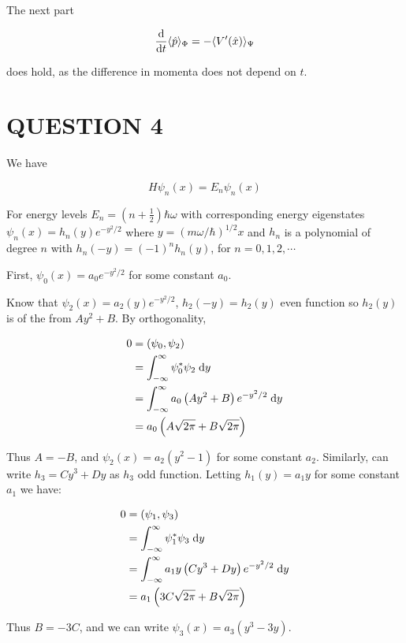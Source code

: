 \documentclass[a4paper]{article}
\begin{document}
The next part 

\[ \frac{\mathrm{d} }{\mathrm{d} t} \langle \hat{p} \rangle_{\Phi}  = - \langle V'(\hat{x})  \rangle_{\Psi}  \]

does hold, as the difference in momenta does not depend on $ t $.

\section{QUESTION 4}

We have

\[ H \psi_{n}(x) = E_{n} \psi_{n}(x)  \]

For energy levels $ E_{n} = (n + \frac{1}{2}) \hbar \omega $ with corresponding energy eigenstates $ \psi_{n}(x) = h_{n}(y) e^{-y^{2}/2} $ where $ y = (m \omega / \hbar )^{1/2} x $ and $ h_{n} $ is a polynomial of degree $ n $ with $ h_{n}(-y) = (-1)^{n} h_{n}(y) $, for $ n = 0,1,2,\cdots $

First, $ \psi_{0}(x) = a_{0} e^{- y^{2} / 2} $ for some constant $ a_{0} $.

Know that $ \psi_{2}(x) = a_{2}(y) e^{-y^{2}/2}  $, $ h_{2}(-y) = h_{2}(y) $ even function so $ h_{2}(y) $ is of the from $ Ay^{2} + B $. By orthogonality,

\begin{align*}
0 & = (\psi_{0},\psi_{2}) \\
& = \int_{- \infty}^{\infty} \psi_{0}^{*} \psi_{2} \; \mathrm{d} y  \\
& = \int_{- \infty}^{\infty} a_{0} \left( Ay^{2} + B \right)e^{- y^{2} / 2}    \; \mathrm{d} y \\
& = a_{0} \left( A \sqrt{2 \pi} + B \sqrt{2 \pi}  \right) 
\end{align*}

Thus $ A = - B $, and $ \psi_{2}(x) = a_2(y^{2} - 1) $ for some constant $ a_{2} $. Similarly, can write $ h_{3} = C y^{3} + D y $ as $ h_{3} $ odd function. Letting $ h_{1}(y) = a_{1} y $ for some constant $ a_{1} $ we have:

\begin{align*}
0 & = (\psi_{1},\psi_{3}) \\
& = \int_{- \infty}^{\infty} \psi_{1}^{*} \psi_{3} \; \mathrm{d} y  \\
& = \int_{- \infty}^{\infty} a_{1} y \left( Cy^{3} + D y \right)e^{- y^{2} / 2}    \; \mathrm{d} y \\
& = a_{1} \left( 3 C   \sqrt{2 \pi} + B \sqrt{2 \pi}  \right) 
\end{align*}


Thus $ B = - 3 C $, and we can write $ \psi_{3}(x) = a_{3}(  y^{3} - 3 y ) $. 
\end{document}
